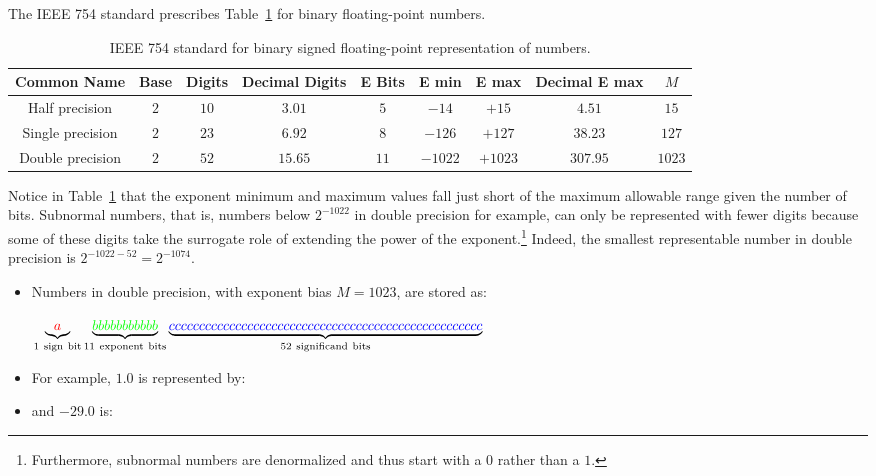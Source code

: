 The IEEE 754 standard prescribes Table~\ref{table:IEEEFloatingPoint} for binary floating-point numbers.

\begin{table}[htdp]
\caption{IEEE 754 standard for binary signed floating-point representation of numbers.}
\begin{center}
\begin{tabular}{ccccccccc}
\hline
Common Name & Base & Digits & Decimal Digits & E Bits & E min & E max & Decimal E max & $M$\\
\hline
Half precision  & $2$ & $10$ & $3.01$ & $5$ & $-14$ & $+15$ & $4.51$ & $15$\\
Single precision  & $2$ & $23$ & $6.92$ & $8$ & $-126$ & $+127$ & $38.23$ & $127$\\
Double precision  & $2$ & $52$ & $15.65$ & $11$ & $-1022$ & $+1023$ & $307.95$ & $1023$\\
\hline
\end{tabular}
\end{center}
\label{table:IEEEFloatingPoint}
\end{table}%

Notice in Table~\ref{table:IEEEFloatingPoint} that the exponent minimum and maximum values fall just short of the maximum allowable range given the number of bits. Subnormal numbers, that is, numbers below $2^{-1022}$ in double precision for example, can only be represented with fewer digits because some of these digits take the surrogate role of extending the power of the exponent.\footnote{Furthermore, subnormal numbers are denormalized and thus start with a $0$ rather than a $1$.} Indeed, the smallest representable number in double precision is $2^{-1022-52} = 2^{-1074}$.

\begin{example}
\begin{itemize}
\item Numbers in double precision, with exponent bias $M=1023$, are stored as:

$\underbrace{\color{red} a}_{\rm 1~sign~bit}\underbrace{\color{green} bbbbbbbbbbb}_{\rm 11~exponent~bits}\underbrace{\color{blue} cccccccccccccccccccccccccccccccccccccccccccccccccccc}_{\rm 52~significand~bits}$

\item For example, $1.0$ is represented by:

{}{}{}

\item and $-29.0$ is:

{}{}{}
\end{itemize}
\end{example}

